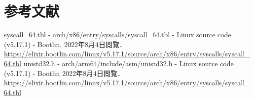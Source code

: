 \documentclass[12pt,a4paper,dvipdfmx]{jsreport}
\begin{document}








\chapter{参考文献}
\begin{thebibliography}{9}
     syscall_64.tbl - arch/x86/entry/syscalls/syscall_64.tbl - Linux source code (v5.17.1) - Bootlin,
        2022年8月4日閲覧．
        \url{https://elixir.bootlin.com/linux/v5.17.1/source/arch/x86/entry/syscalls/syscall_64.tbl}
     unistd32.h - arch/arm64/include/asm/unistd32.h - Linux source code (v5.17.1) - Bootlin
        2022年8月4日閲覧．
        \url{https://elixir.bootlin.com/linux/v5.17.1/source/arch/x86/entry/syscalls/syscall_64.tbl}
\end{thebibliography}
\end{document}
